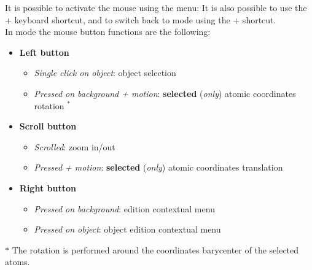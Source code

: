 It is possible to activate the mouse  using the  menu: 
\editoolfig
\laf It is also possible to use the \Alt+ keyboard shortcut, and to switch back to  mode using the \Alt+ shortcut. \\
\noindent In  mode the mouse button functions are the following:
\begin{itemize}
\item {\bf{Left button}}
\begin{itemize}
\item {\em{Single click on object}}: object selection
\item {\em{Pressed on background + motion}}: {\bf{selected}} ({\em{only}}) atomic coordinates rotation $^*$
\end{itemize}
\item {\bf{Scroll button}}
\begin{itemize}
\item {\em{Scrolled}}: zoom in/out
\item {\em{Pressed + motion}}: {\bf{selected}} ({\em{only}}) atomic coordinates translation
\end{itemize}
\item {\bf{Right button}}
\begin{itemize}
\item {\em{Pressed on background}}: edition contextual menu
\item {\em{Pressed on object}}: object edition contextual menu
\end{itemize}
\end{itemize}
$*$ The rotation is performed around the coordinates barycenter of the selected atoms.

